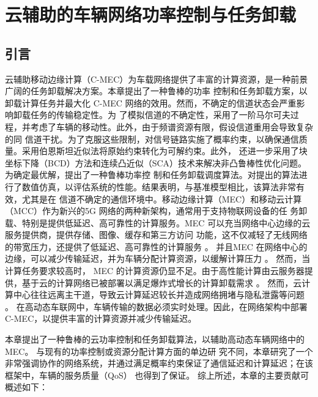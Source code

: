 \chapter{云辅助的车辆网络功率控制与任务卸载} \label{chap:table}  %

\section{引言}\label{section3-1} \label{chap:introduction}
云辅助移动边缘计算（C-MEC）为车载网络提供了丰富的计算资源，是一种前景广阔的任务卸载解决方案。本章提出了一种鲁棒的功率
控制和任务卸载方案，以卸载计算任务并最大化 C-MEC 网络的效用。然而，不确定的信道状态会严重影响卸载任务的传输稳定性。为
了模拟信道的不确定性，采用了一阶马尔可夫过程，并考虑了车辆的移动性。此外，由于频谱资源有限，假设信道重用会导致复杂的同
信道干扰。为了克服这些限制，对信号链路实施了概率约束，以确保通信质量。采用伯恩斯坦近似法将原始约束转化为可解约束。此外，
还进一步采用了块坐标下降（BCD）方法和连续凸近似（SCA）技术来解决非凸鲁棒性优化问题。为确定最优解，提出了一种鲁棒功率控
制和任务卸载调度算法。对提出的算法进行了数值仿真，以评估系统的性能。结果表明，与基准模型相比，该算法非常有效，尤其是在
信道不确定的通信环境中。移动边缘计算（MEC）和移动云计算（MCC）作为新兴的5G 网络的两种新架构，通常用于支持物联网设备的任
务卸载、特别是提供低延迟、高可靠性的计算服务。MEC 可以充当网络中心边缘的云服务提供商，提供存储、图像、缓存和第三方访问
功能，这不仅减轻了无线网络的带宽压力，还提供了低延迟、高可靠性的计算服务 \cite{基于车辆边缘计算的任务卸载策略研究}。
并且MEC 在网络中心的边缘，可以减少传输延迟，并为车辆分配计算资源，以缓解计算压力 \cite{CCO}。 然而，当计算任务要求较高时，
MEC 的计算资源仍显不足。由于高性能计算由云服务器提供，基于云的计算网络已被部署以满足爆炸式增长的计算卸载需求 \supercite{Towards2024,SurveyMEC2017,SurveyMEC2018,DistributedTask2024}。
然而，云计算中心往往远离主干道，导致云计算延迟较长并造成网络拥堵与隐私泄露等问题 \supercite{Qian2023, 曹宇慧车载边缘计算环境下任务协同卸载方法研究,云计算隐私10418975}。
在高动态车联网中，车辆传输的数据必须实时处理。因此，在网络架构中部署C-MEC，以提供丰富的计算资源并减少传输延迟。

本章提出了一种鲁棒的云功率控制和任务卸载算法，以辅助高动态车辆网络中的 MEC。 与现有的功率控制或资源分配计算方面的单边研
究不同，本章研究了一个非常强调协作的网络系统，并通过满足概率约束保证了通信延迟和计算延迟；在该框架中，车辆的服务质量（QoS）
也得到了保证。 综上所述，本章的主要贡献可概述如下：

